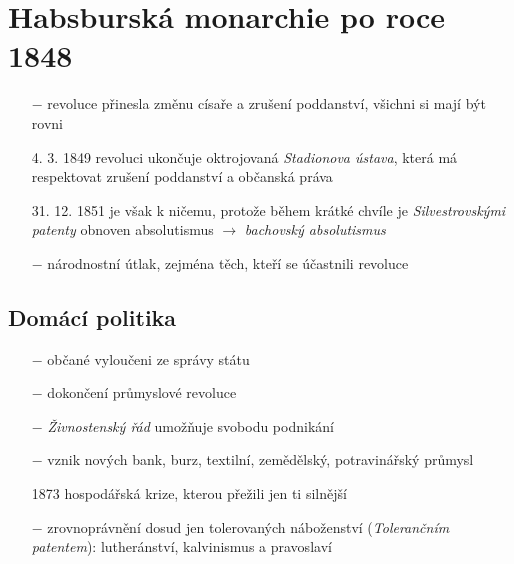 \documentclass{article}
\begin{document}
\section*{Habsburská monarchie po roce 1848}

\begin{itemize}
    \vspace{-0.5em}
    \setlength\itemsep{0.15em}
    \item[$-$] revoluce přinesla změnu císaře a zrušení poddanství, všichni si mají být rovni
    \item[4. 3. 1849] revoluci ukončuje oktrojovaná \textit{Stadionova ústava}, která má respektovat zrušení poddanství a občanská práva
    \item[31. 12. 1851] je však k ničemu, protože během krátké chvíle je \textit{Silvestrovskými patenty} obnoven absolutismus $\rightarrow$ \textit{bachovský absolutismus}
    \item[$-$] národnostní útlak, zejména těch, kteří se účastnili revoluce
\end{itemize}

\subsection*{Domácí politika}
\begin{itemize}
    \vspace{-0.5em}
    \setlength\itemsep{0.15em}
    \item[$-$] občané vyloučeni ze správy státu
    \item[$-$] dokončení průmyslové revoluce
    \item[$-$] \textit{Živnostenský řád} umožňuje svobodu podnikání
    \item[$-$] vznik nových bank, burz, textilní, zemědělský, potravinářský průmysl
    \item[1873] hospodářská krize, kterou přežili jen ti silnější
    \item[$-$] zrovnoprávnění dosud jen tolerovaných náboženství (\textit{Tolerančním patentem}): lutheránství, kalvinismus a pravoslaví
\end{itemize}
\end{document}
